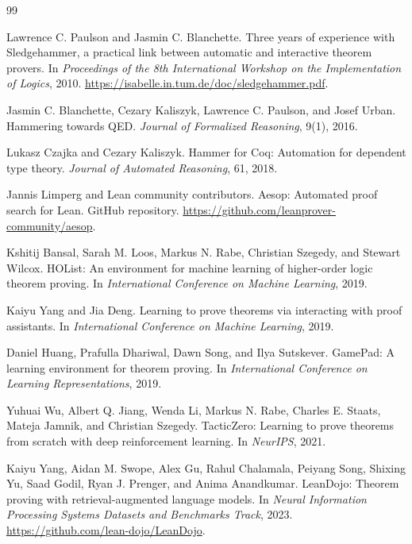 \documentclass[11pt]{article}
\begin{document}
\begin{thebibliography}{99}

Lawrence C. Paulson and Jasmin C. Blanchette.
\newblock Three years of experience with Sledgehammer, a practical link between
automatic and interactive theorem provers.
\newblock In \emph{Proceedings of the 8th International Workshop on the
Implementation of Logics}, 2010.
\newblock \url{https://isabelle.in.tum.de/doc/sledgehammer.pdf}.

Jasmin C. Blanchette, Cezary Kaliszyk, Lawrence C. Paulson, and Josef Urban.
\newblock Hammering towards QED.
\newblock \emph{Journal of Formalized Reasoning}, 9(1), 2016.

Lukasz Czajka and Cezary Kaliszyk.
\newblock Hammer for Coq: Automation for dependent type theory.
\newblock \emph{Journal of Automated Reasoning}, 61, 2018.

Jannis Limperg and Lean community contributors.
\newblock Aesop: Automated proof search for Lean.
\newblock GitHub repository.
\newblock \url{https://github.com/leanprover-community/aesop}.

Kshitij Bansal, Sarah M. Loos, Markus N. Rabe, Christian Szegedy, and Stewart Wilcox.
\newblock HOList: An environment for machine learning of higher-order logic theorem proving.
\newblock In \emph{International Conference on Machine Learning}, 2019.

Kaiyu Yang and Jia Deng.
\newblock Learning to prove theorems via interacting with proof assistants.
\newblock In \emph{International Conference on Machine Learning}, 2019.

Daniel Huang, Prafulla Dhariwal, Dawn Song, and Ilya Sutskever.
\newblock GamePad: A learning environment for theorem proving.
\newblock In \emph{International Conference on Learning Representations}, 2019.

Yuhuai Wu, Albert Q. Jiang, Wenda Li, Markus N. Rabe, Charles E. Staats,
Mateja Jamnik, and Christian Szegedy.
\newblock TacticZero: Learning to prove theorems from scratch with deep
reinforcement learning.
\newblock In \emph{NeurIPS}, 2021.

Kaiyu Yang, Aidan M. Swope, Alex Gu, Rahul Chalamala, Peiyang Song, Shixing Yu,
Saad Godil, Ryan J. Prenger, and Anima Anandkumar.
\newblock LeanDojo: Theorem proving with retrieval-augmented language models.
\newblock In \emph{Neural Information Processing Systems Datasets and
Benchmarks Track}, 2023.
\newblock \url{https://github.com/lean-dojo/LeanDojo}.


\end{thebibliography}
\end{document}
